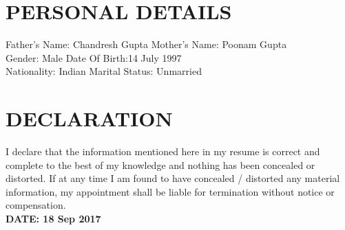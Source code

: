 \documentclass[11pt]{article} %
\newcommand{\NewPart}[1]{\section*{\uppercase{#1}}}
\begin{document}
\NewPart{ Personal Details}{}
Father's Name: Chandresh Gupta 	\hspace{3cm}		Mother's Name: Poonam Gupta \\
Gender: Male 				\hspace{6.35cm}		Date Of Birth:14 July 1997 \\
Nationality: Indian			\hspace{5.40cm}		Marital Status: Unmarried

\NewPart{ Declaration}{}
I declare that the information mentioned here in my resume is correct and complete to the best of my knowledge and nothing has been concealed or distorted. 
If at any time I am found to have concealed / distorted any material information, my appointment shall be liable for termination without notice or compensation. \\


\textbf{DATE: 18 Sep 2017}
\end{document}
